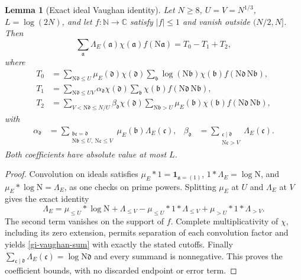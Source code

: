 \documentclass[11pt]{article}
\newtheorem{lemma}[theorem]{Lemma}
\theoremstyle{definition}
\theoremstyle{remark}
\begin{document}
\begin{lemma}[Exact ideal Vaughan identity]\label{gi-vaughan}
Let $N\geq8$, $U=V=N^{1/3}$, $L=\log(2N)$, and let
$f:\mathbb N\longrightarrow\mathbb C$ satisfy $|f|\leq1$ and vanish
outside $(N/2,N]$.  Then
\begin{equation}\label{gi-vaughan-sum}
 \sum_{\mathfrak a}\Lambda_E(\mathfrak a)\chi(\mathfrak a)
                       f(\mathrm N\mathfrak a)=T_0-T_1+T_2,
\end{equation}
where
\begin{align*}
 T_0&=\sum_{\mathrm N\mathfrak d\leq U}\mu_E(\mathfrak d)\chi(\mathfrak d)
       \sum_{\mathfrak b}\log(\mathrm N\mathfrak b)\chi(\mathfrak b)
                  f(\mathrm N\mathfrak d\,\mathrm N\mathfrak b),\\
 T_1&=\sum_{\mathrm N\mathfrak d\leq UV}\alpha_{\mathfrak d}\chi(\mathfrak d)
       \sum_{\mathfrak b}\chi(\mathfrak b)
                  f(\mathrm N\mathfrak d\,\mathrm N\mathfrak b),\\
 T_2&=\sum_{V<\mathrm N\mathfrak d\leq N/U}\beta_{\mathfrak d}\chi(\mathfrak d)
       \sum_{\mathrm N\mathfrak b>U}\mu_E(\mathfrak b)\chi(\mathfrak b)
                  f(\mathrm N\mathfrak d\,\mathrm N\mathfrak b),
\end{align*}
with
\begin{align*}
 \alpha_{\mathfrak d}
   &=\sum_{\substack{\mathfrak b\mathfrak c=\mathfrak d\\
              \mathrm N\mathfrak b\leq U,\ \mathrm N\mathfrak c\leq V}}
                        \mu_E(\mathfrak b)\Lambda_E(\mathfrak c),&
 \beta_{\mathfrak d}
   &=\sum_{\substack{\mathfrak c\mid\mathfrak d\\\mathrm N\mathfrak c>V}}
                        \Lambda_E(\mathfrak c).
\end{align*}
Both coefficients have absolute value at most $L$.
\end{lemma}
\begin{proof}
Convolution on ideals satisfies
$\mu_E*1=\mathbf1_{\mathfrak a=(1)}$, $1*\Lambda_E=\log\mathrm N$,
and $\mu_E*\log\mathrm N=\Lambda_E$, as one checks on prime powers.
Splitting $\mu_E$ at $U$ and $\Lambda_E$ at $V$ gives the exact identity
\begin{equation}\label{gi-convolution-identity}
 \Lambda_E=\mu_{\leq U}*\log\mathrm N+\Lambda_{\leq V}
       -\mu_{\leq U}*1*\Lambda_{\leq V}
       +\mu_{>U}*1*\Lambda_{>V}.
\end{equation}
The second term vanishes on the support of $f$.  Complete multiplicativity
of $\chi$, including its zero extension, permits separation of each
convolution factor and yields \eqref{gi-vaughan-sum} with exactly the
stated cutoffs.  Finally
$\sum_{\mathfrak c\mid\mathfrak d}\Lambda_E(\mathfrak c)
=\log\mathrm N\mathfrak d$ and every summand is nonnegative.  This
proves the coefficient bounds, with no discarded endpoint or error term.
\end{proof}
\end{document}
